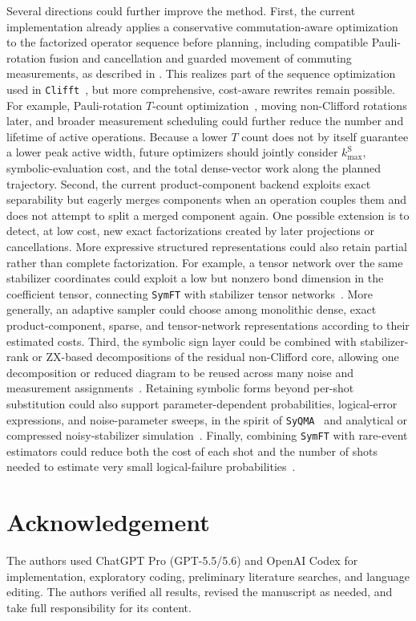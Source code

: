 \documentclass[a4paper,onecolumn,unpublished]{quantumarticle}
\newcommand{\cref}[1]{\zcref{#1}}
\newcommand{\tFont}[1]{\texttt{#1}}
\newcommand{\symft}{\tFont{SymFT}}
\newcommand{\clifft}{\tFont{Clifft}}
\newcommand{\syqma}{\tFont{SyQMA}}
\begin{document}
Several directions could further improve the method.
First, the current implementation already applies a conservative commutation-aware optimization to the factorized operator sequence before planning, including compatible Pauli-rotation fusion and cancellation and guarded movement of commuting measurements, as described in \cref{sec:implementation}.
This realizes part of the sequence optimization used in \clifft{}~\cite{CL26}, but more comprehensive, cost-aware rewrites remain possible.
For example, Pauli-rotation $T$-count optimization~\cite{ZC19}, moving non-Clifford rotations later, and broader measurement scheduling could further reduce the number and lifetime of active operations.
Because a lower $T$ count does not by itself guarantee a lower peak active width, future optimizers should jointly consider $k_{\max}^{\mathrm S}$, symbolic-evaluation cost, and the total dense-vector work along the planned trajectory.
Second, the current product-component backend exploits exact separability but eagerly merges components when an operation couples them and does not attempt to split a merged component again.
One possible extension is to detect, at low cost, new exact factorizations created by later projections or cancellations.
More expressive structured representations could also retain partial rather than complete factorization.
For example, a tensor network over the same stabilizer coordinates could exploit a low but nonzero bond dimension in the coefficient tensor, connecting \symft{} with stabilizer tensor networks~\cite{MG24,NHW25,CRG+26}.
More generally, an adaptive sampler could choose among monolithic dense, exact product-component, sparse, and tensor-network representations according to their estimated costs.
Third, the symbolic sign layer could be combined with stabilizer-rank or ZX-based decompositions of the residual non-Clifford core, allowing one decomposition or reduced diagram to be reused across many noise and measurement assignments~\cite{BG16,KWV22,SK25,HLZ26}.
Retaining symbolic forms beyond per-shot substitution could also support parameter-dependent probabilities, logical-error expressions, and noise-parameter sweeps, in the spirit of \syqma{}~\cite{UA26} and analytical or compressed noisy-stabilizer simulation~\cite{AMM26}.
Finally, combining \symft{} with rare-event estimators could reduce both the cost of each shot and the number of shots needed to estimate very small logical-failure probabilities~\cite{BV13,HWR24,MGO25,BCC+25,YP26}.

\section*{Acknowledgement}

The authors used ChatGPT Pro (GPT-5.5/5.6) and OpenAI Codex for implementation, exploratory coding, preliminary literature searches, and language editing.
The authors verified all results, revised the manuscript as needed, and take full responsibility for its content.


%


\end{document}
